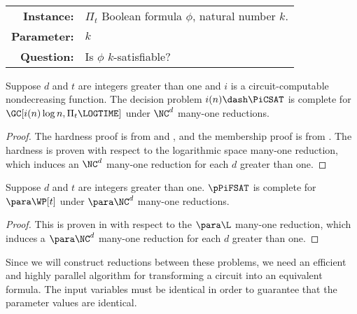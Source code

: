 \begin{definition}
  \mbox{} \\
  \begin{tabular}{r p{9.2cm}}
    \textbf{Instance:} & $\Pi_t$ Boolean formula $\phi$, natural number $k$. \\
    \textbf{Parameter:} & $k$ \\
    \textbf{Question:} & Is $\phi$ $k$-satisfiable?
  \end{tabular}
\end{definition}

\begin{theorem}\label{thm:picsatgc}
  Suppose $d$ and $t$ are integers greater than one and $i$ is a circuit-computable nondecreasing function.
  The decision problem $i(n) \dash \PiCSAT$ is complete for $\GC[i(n) \log n, \Pi_t \LOGTIME]$ under $\NC^d$ many-one reductions.
\end{theorem}
\begin{proof}
  The hardness proof is from \autocite[Theorem~4.4]{cc97lim} and \autocite[Theorem~4.7]{cc97lim}, and the membership proof is from \autocite[Theorem~4.1]{cc97npo}.
  The hardness is proven with respect to the logarithmic space many-one reduction, which induces an $\NC^d$ many-one reduction for each $d$ greater than one.
\end{proof}

\begin{theorem}\label{thm:ppifsat}
  Suppose $d$ and $t$ are integers greater than one.
  $\pPiFSAT$ is complete for $\para \WP[t]$ under $\para \NC^d$ many-one reductions.
\end{theorem}
\begin{proof}
  This is proven in \autocite[Theorem~4.1]{df92} with respect to the $\para \L$ many-one reduction, which induces a $\para \NC^d$ many-one reduction for each $d$ greater than one.
\end{proof}


Since we will construct reductions between these problems, we need an efficient and highly parallel algorithm for transforming a circuit into an equivalent formula.
The input variables must be identical in order to guarantee that the parameter values are identical.

